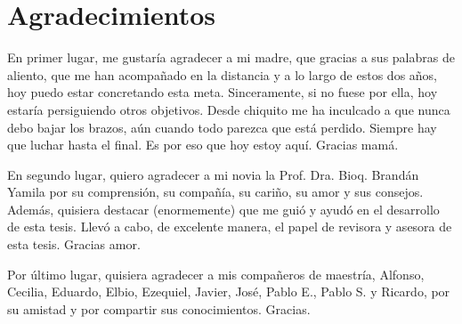 \chapter*{Agradecimientos}
\label{chap:agradecimientos}
En primer lugar, me gustaría agradecer a mi madre, que gracias a sus palabras de aliento, 
que me han acompañado en la distancia y a lo largo de estos dos años, hoy puedo estar
concretando esta meta. Sinceramente, si no fuese por ella, hoy estaría persiguiendo
otros objetivos. Desde chiquito me ha inculcado a que nunca debo bajar los brazos,
aún cuando todo parezca que está perdido. Siempre hay que luchar hasta el final.
Es por eso que hoy estoy aquí. Gracias mamá.

En segundo lugar, quiero agradecer a mi novia la Prof. Dra. Bioq. Brandán Yamila por su
comprensión, su compañía, su cariño, su amor y sus consejos. Además, quisiera destacar
(enormemente) que me guió y ayudó en el desarrollo de esta tesis. Llevó a cabo, de excelente
manera, el papel de revisora y asesora de esta tesis. Gracias amor. 

Por último lugar, quisiera agradecer a mis compañeros de maestría, Alfonso, Cecilia,
Eduardo, Elbio, Ezequiel, Javier, José, Pablo E., Pablo S. y Ricardo, por su amistad y
por compartir sus conocimientos. Gracias.

